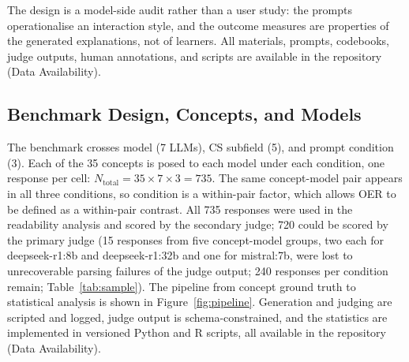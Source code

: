 \documentclass[journal,article,submit,pdftex,moreauthors]{Definitions/mdpi}
\begin{document}
The design is a model-side audit rather than a user study: the prompts operationalise an interaction style, and the outcome measures are properties of the generated explanations, not of learners. All materials, prompts, codebooks, judge outputs, human annotations, and scripts are available in the repository (Data Availability).

\subsection{Benchmark Design, Concepts, and Models}

The benchmark crosses model (7 LLMs), CS subfield (5), and prompt condition (3). Each of the 35 concepts is posed to each model under each condition, one response per cell: $N_{\text{total}} = 35 \times 7 \times 3 = 735$. The same concept-model pair appears in all three conditions, so condition is a within-pair factor, which allows OER to be defined as a within-pair contrast. All 735 responses were used in the readability analysis and scored by the secondary judge; 720 could be scored by the primary judge (15 responses from five concept-model groups, two each for deepseek-r1:8b and deepseek-r1:32b and one for mistral:7b, were lost to unrecoverable parsing failures of the judge output; 240 responses per condition remain; Table~\ref{tab:sample}). The pipeline from concept ground truth to statistical analysis is shown in Figure~\ref{fig:pipeline}. Generation and judging are scripted and logged, judge output is schema-constrained, and the statistics are implemented in versioned Python and R scripts, all available in the repository (Data Availability).
\end{document}
